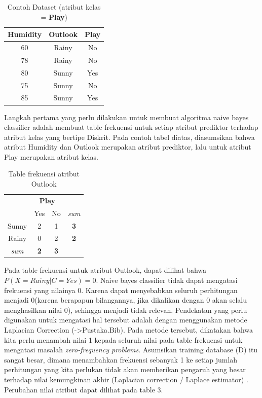 		\begin{table}[H]
		\label{tab:dataset}
		\centering
		\caption{Contoh Dataset (atribut kelas = \textbf{Play})}
		\begin{tabular}{ | c | c | c | }
		\hline
		 Humidity & Outlook & \textbf{Play}\\ \hline \hline
		60 & Rainy & No\\ \hline
		78 & Rainy & No\\ \hline
		80 & Sunny & Yes\\ \hline
		75 & Sunny & No\\ \hline
		85 & Sunny & Yes \\ \hline
		\end{tabular}
		\end{table}
		
		
		Langkah pertama yang perlu dilakukan untuk membuat algoritma naive bayes classifier adalah membuat table frekuensi untuk setiap atribut prediktor terhadap atribut kelas yang bertipe Diskrit. Pada contoh tabel diatas, diasumsikan bahwa atribut Humidity dan Outlook merupakan atribut prediktor, lalu untuk atribut Play merupakan atribut kelas.
		
		\begin{table}[ht]
			\centering
			\caption{Table frekuensi atribut Outlook}
			\begin{tabular}{ | c | c | c | c | }
			\hline
			 & \multicolumn{2}{c}{\textbf{Play}} & \\ 
			 & Yes & No & \textit{sum} \\
			\hline
			Sunny & 2 & 1 & \textbf{3}\\
			\hline
			Rainy & 0 & 2 & \textbf{2} \\
			\hline
			\textit{sum} & \textbf{2} & \textbf{3} & \\
			\hline
			\end{tabular}
		\end{table}
		
		Pada table frekuensi untuk atribut Outlook, dapat dilihat bahwa $P(X=Rainy|C=Yes) = 0$. Naive bayes classifier tidak dapat mengatasi frekuensi yang nilainya 0. Karena dapat menyebabkan seluruh perhitungan menjadi 0(karena berapapun bilangannya, jika dikalikan dengan 0 akan selalu menghasilkan nilai 0), sehingga menjadi tidak relevan. Pendekatan yang perlu digunakan untuk mengatasi hal tersebut adalah dengan menggunakan metode Laplacian Correction (->Pustaka.Bib). Pada metode tersebut, dikatakan bahwa kita perlu menambah nilai 1 kepada seluruh nilai pada table frekuensi untuk mengatasi masalah \textit{zero-frequency problems}. Asumsikan training database (D) itu sangat besar, dimana menambahkan frekuensi sebanyak 1 ke setiap jumlah perhitungan yang kita perlukan tidak akan memberikan pengaruh yang besar terhadap nilai kemungkinan akhir (Laplacian correction / Laplace estimator) \cite{PeughMissing:2004}. Perubahan nilai atribut dapat dilihat pada table 3. \\
		
